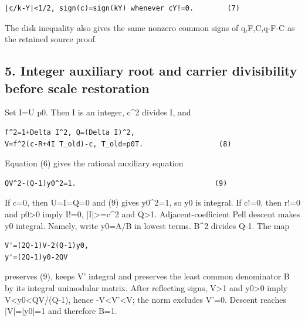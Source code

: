 \begin{verbatim}
|c/k-Y|<1/2, sign(c)=sign(kY) whenever cY!=0.        (7)
\end{verbatim}

The disk inequality also gives the same nonzero common signs of q,F,C,q-F-C as the retained source proof.



\subsection{5. Integer auxiliary root and carrier divisibility before scale restoration}



Set I=\allowbreak{}U p0. Then I is an integer, c\textasciicircum{}\allowbreak{}2 divides I, and



\begin{verbatim}
f^2=1+Delta I^2, Q=(Delta I)^2,
V=f^2(c-R+4I T_old)-c, T_old=p0T.                  (8)
\end{verbatim}

Equation (6) gives the rational auxiliary equation



\begin{verbatim}
QV^2-(Q-1)y0^2=1.                                 (9)
\end{verbatim}

If c=\allowbreak{}0, then U=\allowbreak{}I=\allowbreak{}Q=\allowbreak{}0 and (9) gives y0\textasciicircum{}\allowbreak{}2=\allowbreak{}1, so y0 is integral. If c!=\allowbreak{}0, then r!=\allowbreak{}0 and p0\textgreater{}\allowbreak{}0 imply I!=\allowbreak{}0, |I|\textgreater{}\allowbreak{}=\allowbreak{}c\textasciicircum{}\allowbreak{}2 and Q\textgreater{}\allowbreak{}1. Adjacent-coefficient Pell descent makes y0 integral. Namely, write y0=\allowbreak{}A/\allowbreak{}B in lowest terms. B\textasciicircum{}\allowbreak{}2 divides Q-1. The map



\begin{verbatim}
V'=(2Q-1)V-2(Q-1)y0,
y'=(2Q-1)y0-2QV
\end{verbatim}

preserves (9), keeps V' integral and preserves the least common denominator B by its integral unimodular matrix. After reflecting signs, V\textgreater{}\allowbreak{}1 and y0\textgreater{}\allowbreak{}0 imply V\textless{}\allowbreak{}y0\textless{}\allowbreak{}QV/\allowbreak{}(Q-1), hence -V\textless{}\allowbreak{}V'\textless{}\allowbreak{}V; the norm excludes V'=\allowbreak{}0. Descent reaches |V|=\allowbreak{}|y0|=\allowbreak{}1 and therefore B=\allowbreak{}1.



